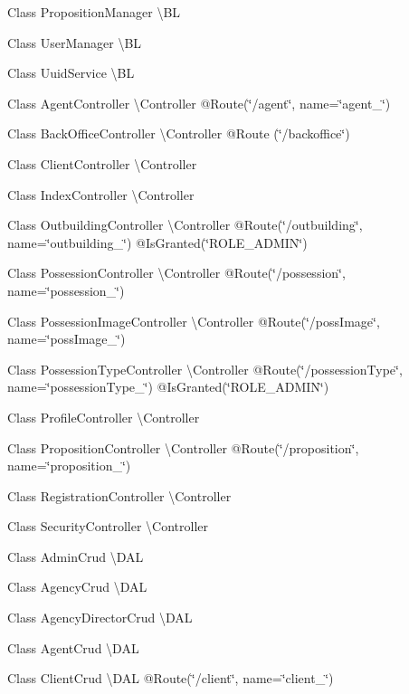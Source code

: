 Class Proposition\+Manager \textbackslash{}\+BL

Class User\+Manager \textbackslash{}\+BL

Class Uuid\+Service \textbackslash{}\+BL

Class Agent\+Controller \textbackslash{}\+Controller @\+Route(\char`\"{}/agent\char`\"{}, name=\char`\"{}agent\+\_\+\char`\"{})

Class Back\+Office\+Controller \textbackslash{}\+Controller @\+Route (\char`\"{}/backoffice\char`\"{})

Class Client\+Controller \textbackslash{}\+Controller

Class Index\+Controller \textbackslash{}\+Controller

Class Outbuilding\+Controller \textbackslash{}\+Controller @\+Route(\char`\"{}/outbuilding\char`\"{}, name=\char`\"{}outbuilding\+\_\+\char`\"{}) @\+Is\+Granted(\char`\"{}\+R\+O\+L\+E\+\_\+\+A\+D\+M\+I\+N\char`\"{})

Class Possession\+Controller \textbackslash{}\+Controller @\+Route(\char`\"{}/possession\char`\"{}, name=\char`\"{}possession\+\_\+\char`\"{})

Class Possession\+Image\+Controller \textbackslash{}\+Controller @\+Route(\char`\"{}/poss\+Image\char`\"{}, name=\char`\"{}poss\+Image\+\_\+\char`\"{})

Class Possession\+Type\+Controller \textbackslash{}\+Controller @\+Route(\char`\"{}/possession\+Type\char`\"{}, name=\char`\"{}possession\+Type\+\_\+\char`\"{}) @\+Is\+Granted(\char`\"{}\+R\+O\+L\+E\+\_\+\+A\+D\+M\+I\+N\char`\"{})

Class Profile\+Controller \textbackslash{}\+Controller

Class Proposition\+Controller \textbackslash{}\+Controller @\+Route(\char`\"{}/proposition\char`\"{}, name=\char`\"{}proposition\+\_\+\char`\"{})

Class Registration\+Controller \textbackslash{}\+Controller

Class Security\+Controller \textbackslash{}\+Controller

Class Admin\+Crud \textbackslash{}\+D\+AL

Class Agency\+Crud \textbackslash{}\+D\+AL

Class Agency\+Director\+Crud \textbackslash{}\+D\+AL

Class Agent\+Crud \textbackslash{}\+D\+AL

Class Client\+Crud \textbackslash{}\+D\+AL @\+Route(\char`\"{}/client\char`\"{}, name=\char`\"{}client\+\_\+\char`\"{})

